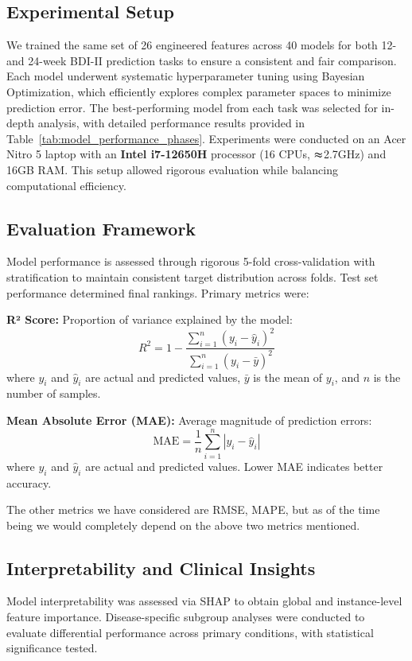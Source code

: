 \documentclass[conference]{IEEEtran}
\begin{document}
\subsection{Experimental Setup}
We trained the same set of 26 engineered features across 40 models for both 12- and 24-week BDI-II prediction tasks to ensure a consistent and fair comparison. Each model underwent systematic hyperparameter tuning using Bayesian Optimization, which efficiently explores complex parameter spaces to minimize prediction error. The best-performing model from each task was selected for in-depth analysis, with detailed performance results provided in Table~\ref{tab:model_performance_phases}. Experiments were conducted on an Acer Nitro 5 laptop with an \textbf{Intel i7-12650H} processor (16 CPUs, $\thickapprox$2.7GHz) and 16GB RAM. This setup allowed rigorous evaluation while balancing computational efficiency.


\subsection{Evaluation Framework}

Model performance is assessed through rigorous 5-fold cross-validation with stratification to maintain consistent target distribution across folds. Test set performance determined final rankings. Primary metrics were:

\noindent \textbf{R² Score:} Proportion of variance explained by the model:
\[
R^2 = 1 - \frac{\sum_{i=1}^{n} (y_i - \hat{y}_i)^2}{\sum_{i=1}^{n} (y_i - \bar{y})^2}
\]
where $y_i$ and $\hat{y}_i$ are actual and predicted values, $\bar{y}$ is the mean of $y_i$, and $n$ is the number of samples.

\noindent \textbf{Mean Absolute Error (MAE):} Average magnitude of prediction errors:
\[
\text{MAE} = \frac{1}{n} \sum_{i=1}^{n} |y_i - \hat{y}_i|
\]
where $y_i$ and $\hat{y}_i$ are actual and predicted values. Lower MAE indicates better accuracy.

The other metrics we have considered are RMSE, MAPE, but as of the time being we would completely depend on the above two metrics mentioned.

\subsection{Interpretability and Clinical Insights}

Model interpretability was assessed via SHAP to obtain global and instance-level feature importance. Disease-specific subgroup analyses were conducted to evaluate differential performance across primary conditions, with statistical significance tested.
\end{document}
